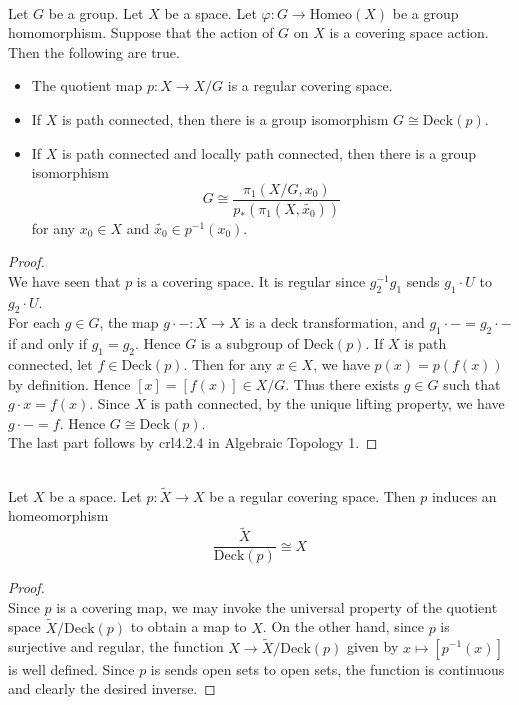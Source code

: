 \documentclass[a4paper]{article}
\begin{document}
\begin{prp}{}{}\\
Let $G$ be a group. Let $X$ be a space. Let $\varphi:G\to\text{Homeo}(X)$ be a group homomorphism. Suppose that the action of $G$ on $X$ is a covering space action. Then the following are true. 
\begin{itemize}
\item The quotient map $p:X\to X/G$ is a regular covering space. 
\item If $X$ is path connected, then there is a group isomorphism $G\cong\text{Deck}(p)$. 
\item If $X$ is path connected and locally path connected, then there is a group isomorphism $$G\cong\frac{\pi_1(X/G,x_0)}{p_\ast(\pi_1(X,\widetilde{x_0}))}$$ for any $x_0\in X$ and $\widetilde{x_0}\in p^{-1}(x_0)$. 
\end{itemize}
\begin{proof}\\
We have seen that $p$ is a covering space. It is regular since $g_2^{-1}g_1$ sends $g_1\cdot U$ to $g_2\cdot U$. \\

For each $g\in G$, the map $g\cdot -:X\to X$ is a deck transformation, and $g_1\cdot -=g_2\cdot -$ if and only if $g_1=g_2$. Hence $G$ is a subgroup of $\text{Deck}(p)$. If $X$ is path connected, let $f\in\text{Deck}(p)$. Then for any $x\in X$, we have $p(x)=p(f(x))$ by definition. Hence $[x]=[f(x)]\in X/G$. Thus there exists $g\in G$ such that $g\cdot x=f(x)$. Since $X$ is path connected, by the unique lifting property, we have $g\cdot -=f$. Hence $G\cong\text{Deck}(p)$. \\

The last part follows by crl4.2.4 in Algebraic Topology 1. 
\end{proof}
\end{prp}

\begin{lmm}{}{}\\
Let $X$ be a space. Let $p:\widetilde{X}\to X$ be a regular covering space. Then $p$ induces an homeomorphism $$\frac{\widetilde{X}}{\text{Deck}(p)}\cong X$$
\begin{proof}\\
Since $p$ is a covering map, we may invoke the universal property of the quotient space $\widetilde{X}/\text{Deck}(p)$ to obtain a map to $X$. On the other hand, since $p$ is surjective and regular, the function $X\to\widetilde{X}/\text{Deck}(p)$ given by $x\mapsto[p^{-1}(x)]$ is well defined. Since $p$ is sends open sets to open sets, the function is continuous and clearly the desired inverse. 
\end{proof}
\end{lmm}
\end{document}
